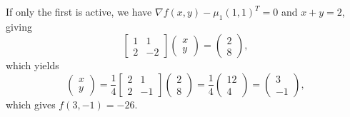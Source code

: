 \begin{solution}
  If only the first is active, we have $\nabla f(x, y) - \mu_1 (1, 1)^T = 0$ and $x + y = 2$, giving
  \begin{equation}
    \begin{bmatrix}
      1 & 1 \\
      2 & -2
    \end{bmatrix}
    \begin{pmatrix}
      x \\
      y
    \end{pmatrix} =
    \begin{pmatrix}
      2 \\
      8
    \end{pmatrix},
  \end{equation}
  which yields
  \begin{equation}
    \begin{pmatrix}
      x \\ y
    \end{pmatrix} =
    \frac{1}{4}
    \begin{bmatrix}
      2 & 1
      \\ 2 & -1
    \end{bmatrix}
    \begin{pmatrix}
      2 \\ 8
    \end{pmatrix} =
    \frac{1}{4}
    \begin{pmatrix}
      12 \\ 4
    \end{pmatrix} =
    \begin{pmatrix} 3 \\-1
    \end{pmatrix},
  \end{equation}
  which gives $f(3, -1) = -26$.


\end{solution}
